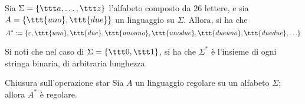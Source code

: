 \documentclass[a4paper, 12pt]{report}
\begin{document}
    \begin{example}[Star]
        Sia $\Sigma = \{\ttt a , \ldots, \ttt z\}$ l'alfabeto composto da 26 lettere, e sia $A = \{\ttt{uno}, \ttt{due}\}$ un linguaggio su $\Sigma$. Allora, si ha che $$A^* := \{\varepsilon, \ttt{uno}, \ttt{due}, \ttt{unouno}, \ttt{unodue}, \ttt{dueuno}, \ttt{duedue}, \ldots\}$$
    \end{example}
   
    \begin{example}
        Si noti che nel caso di $\Sigma = \{ \ttt 0, \ttt 1 \}$, si ha che $\Sigma^*$ è l'insieme di ogni stringa binaria, di arbitraria lunghezza.
    \end{example}

    \begin{framedprop}[label={closure star}]{Chiusura sull'operazione star}
        Sia $A$ un linguaggio regolare su un alfabeto $\Sigma$; allora $A^*$ è regolare.
    \end{framedprop}
\end{document}
